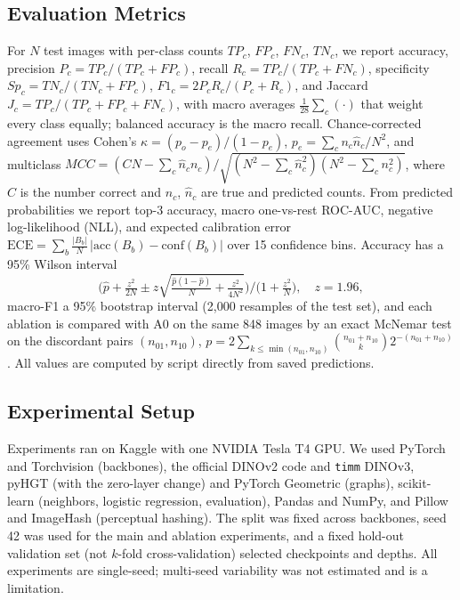 \documentclass[conference]{IEEEtran}
\begin{document}
\subsection{Evaluation Metrics}
\label{sec:evaluation_metrics}
For $N$ test images with per-class counts $TP_c$, $FP_c$, $FN_c$, $TN_c$, we report accuracy, precision $P_c = TP_c/(TP_c+FP_c)$, recall $R_c = TP_c/(TP_c+FN_c)$, specificity $Sp_c = TN_c/(TN_c+FP_c)$, $F1_c = 2P_cR_c/(P_c+R_c)$, and Jaccard $J_c = TP_c/(TP_c+FP_c+FN_c)$, with macro averages $\frac{1}{28}\sum_c(\cdot)$ that weight every class equally; balanced accuracy is the macro recall. Chance-corrected agreement uses Cohen's $\kappa = (p_o-p_e)/(1-p_e)$, $p_e=\sum_c n_c\hat{n}_c/N^2$, and multiclass $MCC = (C N - \sum_c \hat{n}_c n_c)/\sqrt{(N^2-\sum_c \hat{n}_c^2)(N^2-\sum_c n_c^2)}$, where $C$ is the number correct and $n_c$, $\hat{n}_c$ are true and predicted counts. From predicted probabilities we report top-3 accuracy, macro one-vs-rest ROC-AUC, negative log-likelihood (NLL), and expected calibration error $\mathrm{ECE}=\sum_b \frac{|B_b|}{N}\,|\mathrm{acc}(B_b)-\mathrm{conf}(B_b)|$ over 15 confidence bins. Accuracy has a 95\% Wilson interval
\begin{equation}
\Big(\hat{p} + \tfrac{z^2}{2N} \pm z\sqrt{\tfrac{\hat{p}(1-\hat{p})}{N} + \tfrac{z^2}{4N^2}}\Big)\Big/\Big(1 + \tfrac{z^2}{N}\Big), \quad z=1.96,
\label{eq:wilson}
\end{equation}
macro-F1 a 95\% bootstrap interval (2,000 resamples of the test set), and each ablation is compared with A0 on the same 848 images by an exact McNemar test on the discordant pairs $(n_{01}, n_{10})$, $p = 2\sum_{k\le\min(n_{01},n_{10})}\binom{n_{01}+n_{10}}{k}2^{-(n_{01}+n_{10})}$. All values are computed by script directly from saved predictions.

\subsection{Experimental Setup}
\label{sec:experimental_setup}
Experiments ran on Kaggle with one NVIDIA Tesla T4 GPU. We used PyTorch and Torchvision (backbones), the official DINOv2 code and \texttt{timm} DINOv3, pyHGT (with the zero-layer change) and PyTorch Geometric (graphs), scikit-learn (neighbors, logistic regression, evaluation), Pandas and NumPy, and Pillow and ImageHash (perceptual hashing). The split was fixed across backbones, seed 42 was used for the main and ablation experiments, and a fixed hold-out validation set (not $k$-fold cross-validation) selected checkpoints and depths. All experiments are single-seed; multi-seed variability was not estimated and is a limitation.
\end{document}
